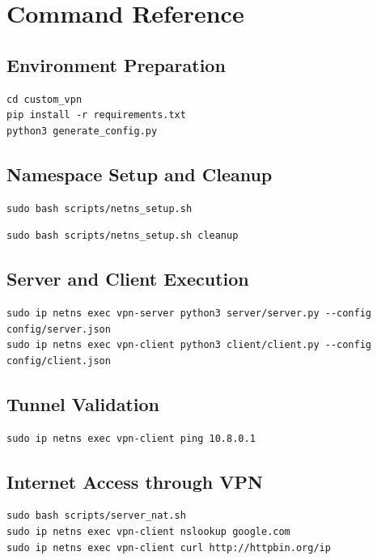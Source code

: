\chapter{Command Reference}

\section{Environment Preparation}
\begin{lstlisting}[style=vpnbash,caption={Install dependencies and generate configs}]
cd custom_vpn
pip install -r requirements.txt
python3 generate_config.py
\end{lstlisting}

\section{Namespace Setup and Cleanup}
\begin{lstlisting}[style=vpnbash,caption={Namespace setup}]
sudo bash scripts/netns_setup.sh
\end{lstlisting}

\begin{lstlisting}[style=vpnbash,caption={Namespace cleanup}]
sudo bash scripts/netns_setup.sh cleanup
\end{lstlisting}

\section{Server and Client Execution}
\begin{lstlisting}[style=vpnbash,caption={Run server and client in dual namespace mode}]
sudo ip netns exec vpn-server python3 server/server.py --config config/server.json
sudo ip netns exec vpn-client python3 client/client.py --config config/client.json
\end{lstlisting}

\section{Tunnel Validation}
\begin{lstlisting}[style=vpnbash,caption={Basic tunnel check}]
sudo ip netns exec vpn-client ping 10.8.0.1
\end{lstlisting}

\section{Internet Access through VPN}
\begin{lstlisting}[style=vpnbash,caption={NAT setup and connectivity checks}]
sudo bash scripts/server_nat.sh
sudo ip netns exec vpn-client nslookup google.com
sudo ip netns exec vpn-client curl http://httpbin.org/ip
\end{lstlisting}

